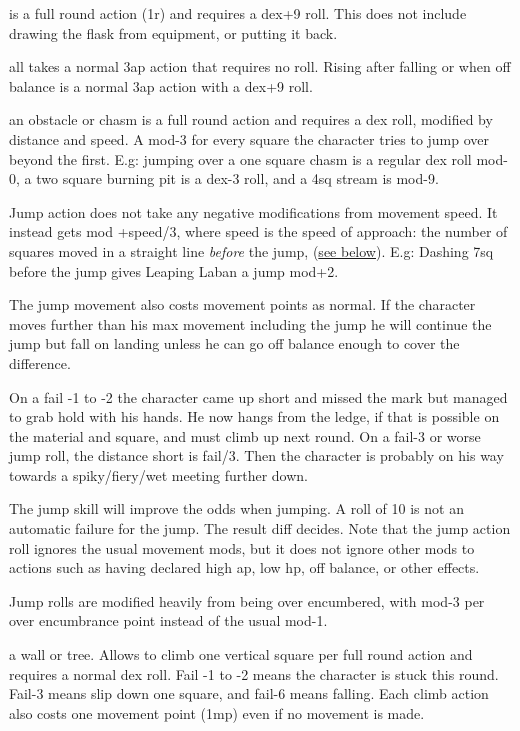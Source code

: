  is a full round action (1r) and requires a dex+9 roll. This does not include drawing the flask from equipment, or putting it back.


 all takes a normal 3ap action that requires no roll. Rising after falling or when off balance is a normal 3ap action with a dex+9 roll.


 an obstacle or chasm is a full round action and requires a dex roll, modified by distance and speed. A mod-3 for every square the character tries to jump over beyond the first. E.g: jumping over a one square chasm is a regular dex roll mod-0, a two square burning pit is a dex-3 roll, and a 4sq stream is mod-9.

Jump action does not take any negative modifications from movement speed. It instead gets mod +speed/3, where speed is the speed of approach: the number of squares moved in a straight line \emph{before} the jump, (\hyperref[approach]{see below}).
E.g: Dashing 7sq before the jump gives Leaping Laban a jump mod+2.

The jump movement also costs movement points as normal. If the character moves further than his max movement including the jump he will continue the jump but fall on landing unless he can go off balance enough to cover the difference.

On a fail -1 to -2 the character came up short and missed the mark but managed to grab hold with his hands. He now hangs from the ledge, if that is possible on the material and square, and must climb up next round. On a fail-3 or worse jump roll, the distance short is fail/3. Then the character is probably on his way towards a spiky/fiery/wet meeting further down.

The jump skill will improve the odds when jumping. A roll of 10 is not an automatic failure for the jump. The result diff decides. Note that the jump action roll ignores the usual movement mods, but it does not ignore other mods to actions such as having declared high ap, low hp, off balance, or other effects.

Jump rolls are modified heavily from being over encumbered, with mod-3 per over encumbrance point instead of the usual mod-1.


 a wall or tree. Allows to climb one vertical square per full round action and requires a normal dex roll. Fail -1 to -2 means the character is stuck this round. Fail-3 means slip down one square, and fail-6 means falling. Each climb action also costs one movement point (1mp) even if no movement is made.

